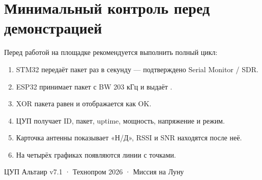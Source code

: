 \documentclass[11pt,a4paper]{article}
\newcommand{\code}[1]{\texttt{\detokenize{#1}}}
\begin{document}
\section{Минимальный контроль перед демонстрацией}

Перед работой на площадке рекомендуется выполнить полный цикл:

\begin{enumerate}[leftmargin=7mm]
\item STM32 передаёт пакет раз в секунду — подтверждено Serial Monitor / SDR.
\item ESP32 принимает пакет с BW 203 кГц и выдаёт \code{$TEL,...}.
\item XOR пакета равен \code{33} и отображается как OK.
\item ЦУП получает ID, пакет, uptime, мощность, напряжение и режим.
\item Карточка антенны показывает «Н/Д», RSSI и SNR находятся после неё.
\item На четырёх графиках появляются линии с точками.
\end{enumerate}

\vfill
\begin{center}
\small ЦУП Альтаир v7.1 · Технопром 2026 · Миссия на Луну
\end{center}
\end{document}
